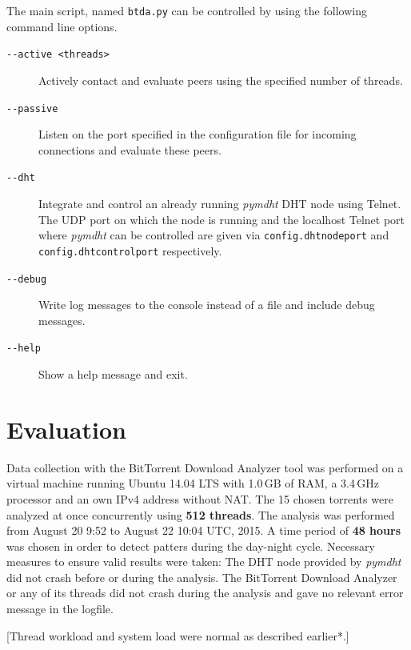 \documentclass[10pt, a4paper, twoside, headsepline]{scrbook}
\renewcommand{\_}{\origunderscore\allowbreak}
\newcommand{\config}[1]{\texttt{config.\allowbreak #1}}
\newcommand{\range}{from August 20 9:52 to August 22 10:04 UTC, 2015} %
\begin{document}
The main script, named \texttt{btda.py} can be controlled by using the following command line options.

\begin{description}
  \item[\texttt{-{}-active <threads>}] Actively contact and evaluate peers using the specified number of threads.
  \item[\texttt{-{}-passive}] Listen on the port specified in the configuration file for incoming connections and evaluate these peers.
  \item[\texttt{-{}-dht}] Integrate and control an already running \emph{pymdht} \cite{pymdht} DHT node using Telnet. The UDP port on which the node is running and the localhost Telnet port where \emph{pymdht} can be controlled are given via \config{dht\_node\_port} and \config{dht\_control\_port} respectively.
  \item[\texttt{-{}-debug}] Write log messages to the console instead of a file and include debug messages.
  \item[\texttt{-{}-help}] Show a help message and exit.
\end{description}

\chapter{Evaluation}
Data collection with the BitTorrent Download Analyzer tool was performed on a virtual machine running Ubuntu 14.04 LTS with 1.0\,GB of RAM, a 3.4\,GHz processor and an own IPv4 address without NAT. The 15 chosen torrents were analyzed at once concurrently using \textbf{512 threads}. The analysis was performed \range. A time period of \textbf{48 hours} was chosen in order to detect patters during the day-night cycle. Necessary measures to ensure valid results were taken: The DHT node provided by \emph{pymdht} did not crash before or during the analysis. The BitTorrent Download Analyzer or any of its threads did not crash during the analysis and gave no relevant error message in the logfile.

[Thread workload and system load were normal as described earlier*.]
\end{document}
